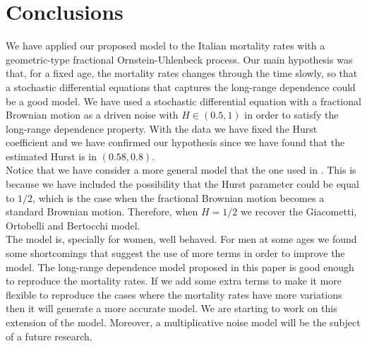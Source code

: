 \documentclass[smallextended]{svjour3}
\begin{document}
\section{Conclusions}


We have applied our proposed model to the Italian mortality rates with a
geometric-type fractional Ornstein-Uhlenbeck process. Our
main hypothesis was that, for a fixed age, the mortality rates changes through
the time slowly, so that a stochastic differential equations
that captures the long-range dependence could be a good model. We have used a
stochastic differential equation with a fractional Brownian motion as a driven
noise with $H\in (0.5,1)$ in order to satisfy the long-range dependence
property. With the data we have fixed the Hurst coefficient and we have
confirmed our hypothesis since
we have found that the estimated Hurst is in $(0.58,0.8)$.  \\



Notice that we have consider a more general model that the one used in
\cite{gi-or-be}. This is because we have included the possibility that the
Hurst parameter could be equal to $1/2$, which is the case when the fractional
Brownian motion becomes a standard Brownian motion. Therefore,
when $H=1/2$ we recover the  Giacometti, Ortobelli and Bertocchi model.\\





The model is, specially for women, well behaved. For men at some ages we found
some shortcomings that suggest the use of more terms in order to improve
the model. The long-range dependence model proposed in this paper is good
enough to reproduce the mortality rates. If we add some extra terms to make it
more flexible to reproduce the cases where the mortality rates have more
variations then it will generate a more accurate model. We are starting to work
on this extension of the model. Moreover, a multiplicative noise model will be
the subject of a future research.\\
\end{document}
